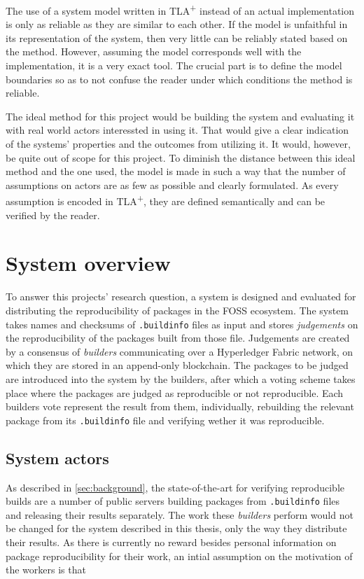 \documentclass[english, biblatex, digitaloutput]{kththesis}
\begin{document}
The use of a system model written in TLA\textsuperscript+ instead of an actual implementation is only as reliable as they are similar to each other. If the model is unfaithful in its representation of the system, then very little can be reliably stated based on the method. However, assuming the model corresponds well with the implementation, it is a very exact tool. The crucial part is to define the model boundaries so as to not confuse the reader under which conditions the method is reliable.

The ideal method for this project would be building the system and evaluating it with real world actors interessted in using it. That would give a clear indication of the systems' properties and the outcomes from utilizing it. It would, however, be quite out of scope for this project. To diminish the distance between this ideal method and the one used, the model is made in such a way that the number of assumptions on actors are as few as possible and clearly formulated. As every assumption is encoded in TLA\textsuperscript+, they are defined semantically and can be verified by the reader.

\section{System overview}
\label{sec:systemOverview}

To answer this projects' research question, a system is designed and evaluated for distributing the reproducibility of packages in the \gls{FOSS} ecosystem. The system takes names and checksums of \texttt{.buildinfo} files as input and stores \textit{judgements} on the reproducibility of the packages built from those file. Judgements are created by a consensus of \textit{builders} communicating over a Hyperledger Fabric network, on which they are stored in an append-only blockchain. The packages to be judged are introduced into the system by the builders, after which a voting scheme takes place where the packages are judged as reproducible or not reproducible. Each builders vote represent the result from them, individually, rebuilding the relevant package from its \texttt{.buildinfo} file and verifying wether it was reproducible.

\subsection{System actors}
\label{sec:systemActors}

As described in \ref{sec:background}, the state-of-the-art for verifying reproducible builds are a number of public servers building packages from \texttt{.buildinfo} files and releasing their results separately. The work these \textit{builders} perform would not be changed for the system described in this thesis, only the way they distribute their results. As there is currently no reward besides personal information on package reproducibility for their work, an intial assumption on the motivation of the workers is that
\end{document}
